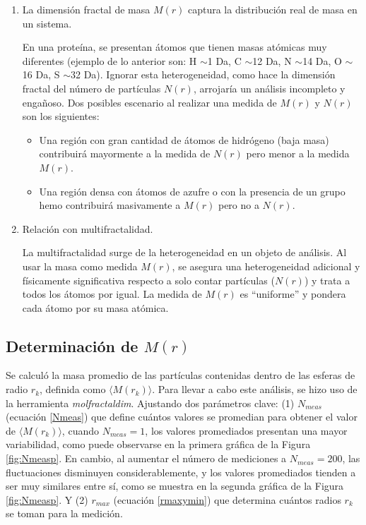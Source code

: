 	 \begin{enumerate}
	 	\item La dimensi\'{o}n fractal de masa $M(r)$ captura la distribución real de masa en un sistema. 
	 	
	 	En una proteína, se presentan átomos que tienen masas atómicas muy diferentes (ejemplo de lo anterior son: H $\sim$1 Da, C $\sim$12 Da, N $\sim$14 Da, O $\sim$16 Da, S $\sim$32 Da). Ignorar esta heterogeneidad, como hace la dimensi\'{o}n fractal del n\'{u}mero de part\'{i}culas $N(r)$, arrojaría un análisis incompleto y engañoso. Dos posibles escenario al realizar una medida de $M(r)$ y $N(r)$ son los siguientes:
	 	 
	 	 \begin{itemize}
	 	 	\item Una región con gran cantidad de átomos de hidrógeno (baja masa) contribuirá mayormente a la medida de $N(r)$ pero menor a la medida $M(r)$.
	 	 	
	 	 	\item Una región densa con átomos de azufre o con la presencia de un grupo hemo contribuirá masivamente a $M(r)$ pero no a $N(r)$.
	 	 \end{itemize}
	 	 
		\item Relación con multifractalidad.
		
		La multifractalidad surge de la heterogeneidad en un objeto de análisis. Al usar la masa como medida $M(r)$, se asegura una heterogeneidad adicional y físicamente significativa respecto a solo contar partículas ($N(r)$) y trata a todos los átomos por igual. La medida de $M(r)$ es ``uniforme'' y pondera cada átomo por su masa atómica.
	 	 
	 \end{enumerate}
	
	
	\subsection{Determinaci\'{o}n de $M(r)$}
	\label{sec:detM(r)}
	
	Se calcul\'{o} la masa promedio de las part\'{i}culas 
	contenidas dentro de las esferas de radio $r_k$, definida 
	como $\langle M(r_{k}) \rangle$. 
	Para llevar a cabo este an\'{a}lisis, se hizo uso de la 
	herramienta \textit{molfractaldim}. Ajustando dos par\'{a}metros
	clave: (1) $N_{meas}$ (ecuaci\'{o}n \ref{Nmeas}) que define cu\'{a}ntos 
	valores se promedian para obtener el valor de $\langle M(r_{k}) \rangle$,
	cuando $N_{meas} = 1$, los valores promediados presentan una mayor 
	variabilidad, como puede observarse en la primera gr\'{a}fica de la 
	Figura \ref{fig:Nmeasp}. En cambio, al aumentar el n\'{u}mero de mediciones 
	a $N_{meas} = 200$, las fluctuaciones disminuyen considerablemente,
	 y los valores promediados tienden a ser muy similares entre s\'{i}, como se 
	 muestra en la segunda gr\'{a}fica de la Figura \ref{fig:Nmeasp}.
	 Y (2) $r_{max}$ (ecuaci\'{o}n \ref{rmaxymin}) que determina 
	cu\'{a}ntos radios $r_{k}$ se toman para la medici\'{o}n.
	
